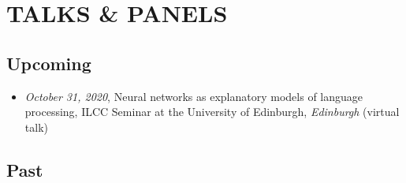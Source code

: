 \section{TALKS \& PANELS}

\subsection{Upcoming}
\begin{itemize}
\setlength\itemsep{5pt}
\item \textit{October 31, 2020}, Neural networks as explanatory models of language processing, ILCC Seminar at the University of Edinburgh, \textit{Edinburgh} (virtual talk)
\end{itemize}

\subsection{Past}
